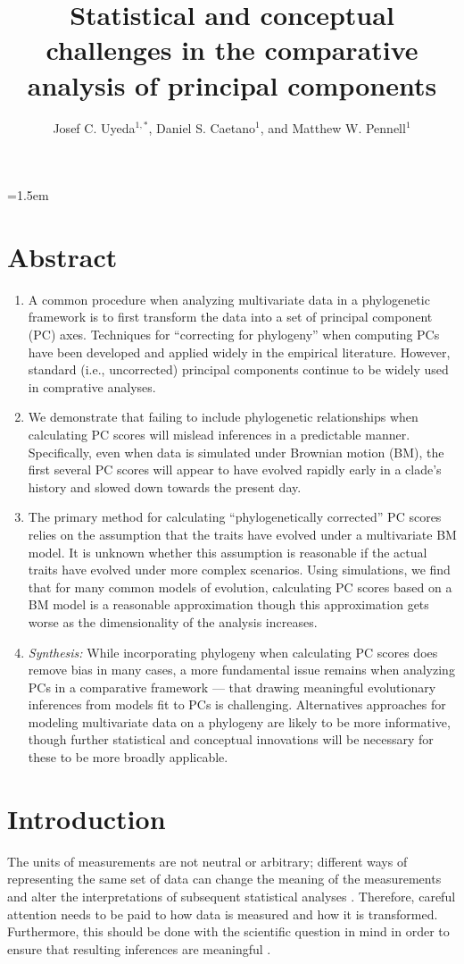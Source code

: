 \documentclass[a4paper,12pt]{article}
\title{Statistical and conceptual challenges in the comparative analysis of principal components}
\author{
Josef C. Uyeda$^{1,*}$, Daniel S. Caetano$^1$, and Matthew W. Pennell$^1$
}
\date{}
\affiliation{
 $^{1}$ Department of Biological Sciences \& Institute for Bioinformatics and Evolutionary Studies, University of Idaho, Moscow, ID 83844, U.S.A.\\ 
 $^{*}$ Email for correspondence: \texttt{pseudacris@gmail.com}\\
}
\begin{document}
\mstitlepage
\parindent=1.5em
\addtolength{\parskip}{.3em}
\vfill

\section{Abstract}
\begin{enumerate}
\item A common procedure when analyzing multivariate data in a phylogenetic framework is to first transform the data into a set of principal component (PC) axes. Techniques for ``correcting for phylogeny'' when computing PCs have been developed and applied widely in the empirical literature. However, standard (i.e., uncorrected) principal components continue to be widely used in comprative analyses.

\item We demonstrate that failing to include phylogenetic relationships when calculating PC scores will mislead inferences in a predictable manner. Specifically, even when data is simulated under Brownian motion (BM), the first several PC scores will appear to have evolved rapidly early in a clade's history and slowed down towards the present day.

\item The primary method for calculating ``phylogenetically corrected'' PC scores relies on the assumption that the traits have evolved under a multivariate BM model. It is unknown whether this assumption is reasonable if the actual traits have evolved under more complex scenarios. Using simulations, we find that for many common models of evolution, calculating PC scores based on a BM model is a reasonable approximation though this approximation gets worse as the dimensionality of the analysis increases.

\item \emph{Synthesis:} While incorporating phylogeny when calculating PC scores does remove bias in many cases, a more fundamental issue remains when analyzing PCs in a comparative framework --- that drawing meaningful evolutionary inferences from models fit to PCs is challenging. Alternatives approaches for modeling multivariate data on a phylogeny are likely to be more informative, though further statistical and conceptual innovations will be necessary for these to be more broadly applicable.
\end{enumerate} 

\newpage

\section{Introduction}
The units of measurements are not neutral or arbitrary; different ways of representing the same set of data can change the meaning of the measurements and alter the interpretations of subsequent statistical analyses \citep{Hand2004, HansenHoule2008, Houle2011}. Therefore, careful attention needs to be paid to how data is measured and how it is transformed. Furthermore, this should be done with the scientific question in mind in order to ensure that resulting inferences are meaningful \citep{Houle2011}. 
\end{document}
